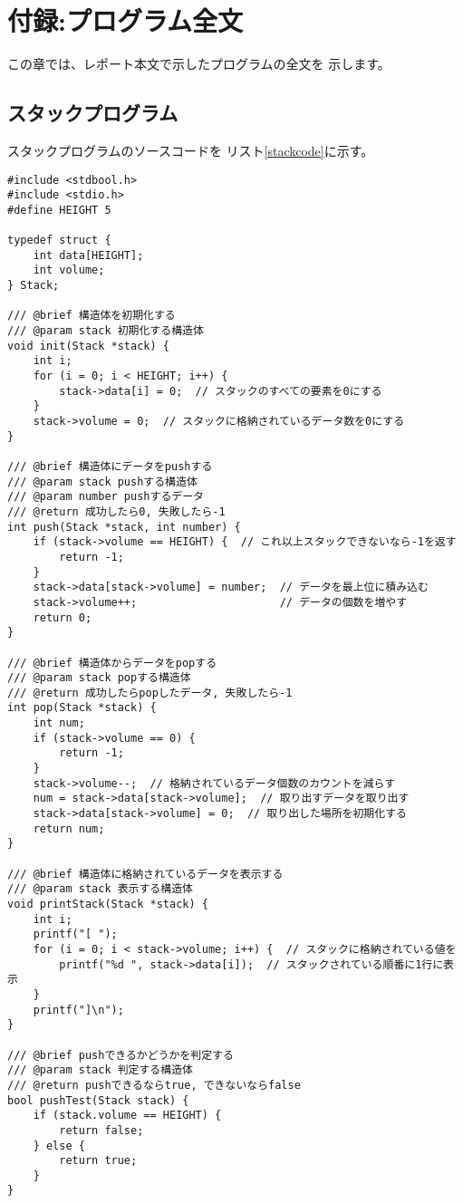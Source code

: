 \documentclass[a4j]{jarticle}
\begin{document}
\section{付録:プログラム全文}
この章では、レポート本文で示したプログラムの全文を
示します。
\subsection{スタックプログラム}
スタックプログラムのソースコードを
リスト\ref{stackcode}に示す。
\begin{lstlisting}[caption=スタックプログラム,label=stackcode]
#include <stdbool.h>
#include <stdio.h>
#define HEIGHT 5

typedef struct {
    int data[HEIGHT];
    int volume;
} Stack;

/// @brief 構造体を初期化する
/// @param stack 初期化する構造体
void init(Stack *stack) {
    int i;
    for (i = 0; i < HEIGHT; i++) {
        stack->data[i] = 0;  // スタックのすべての要素を0にする
    }
    stack->volume = 0;  // スタックに格納されているデータ数を0にする
}

/// @brief 構造体にデータをpushする
/// @param stack pushする構造体
/// @param number pushするデータ
/// @return 成功したら0, 失敗したら-1
int push(Stack *stack, int number) {
    if (stack->volume == HEIGHT) {  // これ以上スタックできないなら-1を返す
        return -1;
    }
    stack->data[stack->volume] = number;  // データを最上位に積み込む
    stack->volume++;                      // データの個数を増やす
    return 0;
}

/// @brief 構造体からデータをpopする
/// @param stack popする構造体
/// @return 成功したらpopしたデータ, 失敗したら-1
int pop(Stack *stack) {
    int num;
    if (stack->volume == 0) {
        return -1;
    }
    stack->volume--;  // 格納されているデータ個数のカウントを減らす
    num = stack->data[stack->volume];  // 取り出すデータを取り出す
    stack->data[stack->volume] = 0;  // 取り出した場所を初期化する
    return num;
}

/// @brief 構造体に格納されているデータを表示する
/// @param stack 表示する構造体
void printStack(Stack *stack) {
    int i;
    printf("[ ");
    for (i = 0; i < stack->volume; i++) {  // スタックに格納されている値を
        printf("%d ", stack->data[i]);  // スタックされている順番に1行に表示
    }
    printf("]\n");
}

/// @brief pushできるかどうかを判定する
/// @param stack 判定する構造体
/// @return pushできるならtrue, できないならfalse
bool pushTest(Stack stack) {
    if (stack.volume == HEIGHT) {
        return false;
    } else {
        return true;
    }
}


\end{lstlisting}
\end{document}
